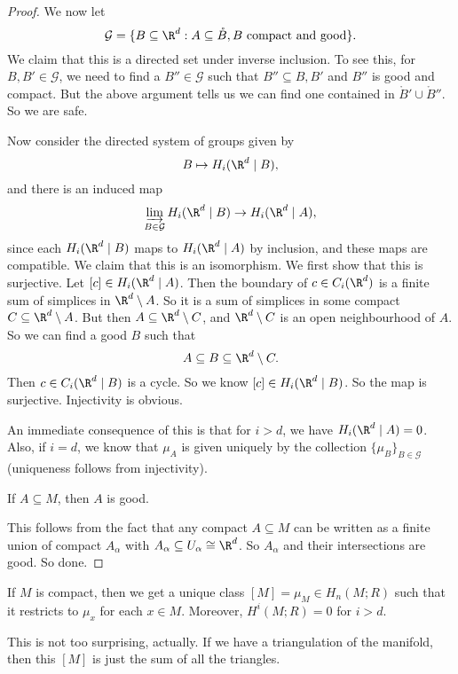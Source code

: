 \documentclass[a4paper]{article}
\begin{document}
\begin{proof}
  We now let
  \[
    \mathcal{G} = \{B \subseteq \R^d: A \subseteq \mathring{B}, B\text{ compact and good}\}.
  \]
  We claim that this is a directed set under inverse inclusion. To see this, for $B, B' \in \mathcal{G}$, we need to find a $B'' \in \mathcal{G}$ such that $B'' \subseteq B, B'$ and $B''$ is good and compact. But the above argument tells us we can find one contained in $\mathring{B}' \cup \mathring{B}''$. So we are safe.

  Now consider the directed system of groups given by
  \[
    B \mapsto H_i(\R^d \mid B),
  \]
  and there is an induced map
  \[
    \varinjlim_{B \in \mathcal{G}} H_i(\R^d \mid B) \to H_i(\R^d \mid A),
  \]
  since each $H_i(\R^d \mid B)$ maps to $H_i(\R^d \mid A)$ by inclusion, and these maps are compatible. We claim that this is an isomorphism. We first show that this is surjective. Let $[c] \in H_i(\R^d \mid A)$. Then the boundary of $c \in C_i(\R^d)$ is a finite sum of simplices in $\R^d \setminus A$. So it is a sum of simplices in some compact $C \subseteq \R^d \setminus A$. But then $A \subseteq \R^d \setminus C$, and $\R^d \setminus C$ is an open neighbourhood of $A$. So we can find a good $B$ such that
  \[
    A \subseteq B \subseteq \R^d \setminus C.
  \]
  Then $c \in C_i(\R^d \mid B)$ is a cycle. So we know $[c] \in H_i(\R^d \mid B)$. So the map is surjective. Injectivity is obvious.

  An immediate consequence of this is that for $i > d$, we have $H_i(\R^d \mid A) = 0$. Also, if $i = d$, we know that $\mu_A$ is given uniquely by the collection $\{\mu_B\}_{B \in \mathcal{G}}$ (uniqueness follows from injectivity).

  \begin{claim}
    If $A \subseteq M$, then $A$ is good.
  \end{claim}
  This follows from the fact that any compact $A \subseteq M$ can be written as a finite union of compact $A_\alpha$ with $A_\alpha \subseteq U_\alpha \cong \R^d$. So $A_\alpha$ and their intersections are good. So done.
\end{proof}

\begin{cor}
  If $M$ is compact, then we get a unique class $[M] = \mu_M \in H_n(M; R)$ such that it restricts to $\mu_x$ for each $x \in M$. Moreover, $H^i(M; R) = 0$ for $i > d$.
\end{cor}
This is not too surprising, actually. If we have a triangulation of the manifold, then this $[M]$ is just the sum of all the triangles.
\end{document}
